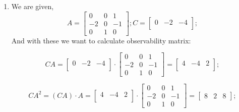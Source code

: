 \documentclass[12pt,a4paper, margin=1in]{article}
\begin{document}
\begin{enumerate}
\begin{enumerate}
            \item We are given,\\
            \begin{equation*}
            A =
            \begin{bmatrix}
                0 & 0 & 1\\
                -2 & 0 & -1\\
                0 & 1 & 0
            \end{bmatrix}; 
            C = 
            \begin{bmatrix}
                0 & -2 & -4\\
            \end{bmatrix}; 
            \end{equation*}
            And with these we want to calculate observability matrix:


            \begin{equation*}
            CA =
            \begin{bmatrix}
                0 & -2 & -4\\
            \end{bmatrix}
            \cdot
            \begin{bmatrix}
                0 & 0 & 1\\
                -2 & 0 & -1\\
                0 & 1 & 0
            \end{bmatrix}=
            \begin{bmatrix}
                4 & -4 & 2\\
            \end{bmatrix}; 
            \end{equation*}


            \begin{equation*}
            CA^2 = (CA)\cdot A =
            \begin{bmatrix}
                4 & -4 & 2\\
            \end{bmatrix}
            \cdot
            \begin{bmatrix}
                0 & 0 & 1\\
                -2 & 0 & -1\\
                0 & 1 & 0
            \end{bmatrix}=
            \begin{bmatrix}
                8 & 2 & 8
            \end{bmatrix}; 
            \end{equation*}




\end{enumerate}
\end{enumerate}
\end{document}

